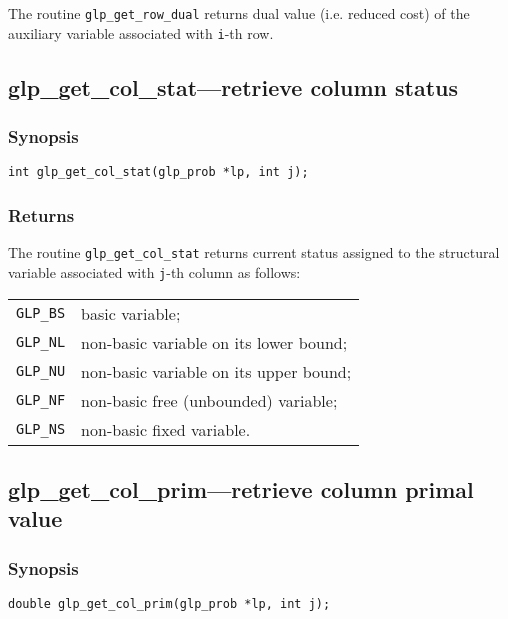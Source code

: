The routine \verb|glp_get_row_dual| returns dual value (i.e. reduced
cost) of the auxiliary variable associated with \verb|i|-th row.

\subsection{glp\_get\_col\_stat---retrieve column status}

\subsubsection*{Synopsis}

\begin{verbatim}
int glp_get_col_stat(glp_prob *lp, int j);
\end{verbatim}

\subsubsection*{Returns}

The routine \verb|glp_get_col_stat| returns current status assigned to
the structural variable associated with \verb|j|-th column as follows:

\begin{tabular}{@{}ll}
\verb|GLP_BS| & basic variable; \\
\verb|GLP_NL| & non-basic variable on its lower bound; \\
\verb|GLP_NU| & non-basic variable on its upper bound; \\
\verb|GLP_NF| & non-basic free (unbounded) variable; \\
\verb|GLP_NS| & non-basic fixed variable. \\
\end{tabular}

\newpage

\subsection{glp\_get\_col\_prim---retrieve column primal value}

\subsubsection*{Synopsis}

\begin{verbatim}
double glp_get_col_prim(glp_prob *lp, int j);
\end{verbatim}

